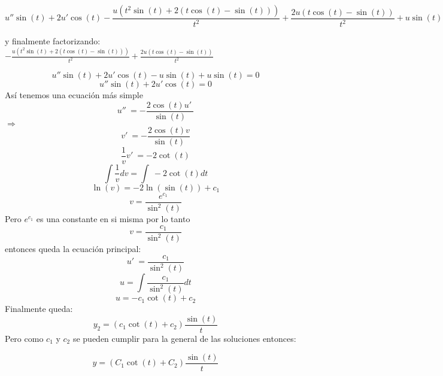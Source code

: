     $$u''\sin \left(t\right)+2u'\cos \left(t\right)-\frac{u\left(t^2\sin \left(t\right)+2\left(t\cos \left(t\right)-\sin \left(t\right)\right)\right)}{t^2}+\frac{2u\left(t\cos \left(t\right)-\sin \left(t\right)\right)}{t^2}+u\sin \left(t\right)$$
    
    y finalmente factorizando: $-\frac{u\left(t^2\sin \left(t\right)+2\left(t\cos \left(t\right)-\sin \left(t\right)\right)\right)}{t^2}+\frac{2u\left(t\cos \left(t\right)-\sin \left(t\right)\right)}{t^2}$
    
    $$u''\sin \left(t\right)+2u'\cos \left(t\right)-u\sin \left(t\right)+u\sin \left(t\right)=0$$
    $$u''\sin \left(t\right)+2u'\cos \left(t\right)=0$$
    Así tenemos una ecuación más simple
    $$u''\:=-\frac{2\cos \left(t\right)u'\:}{\sin \left(t\right)}$$
    $\Rightarrow$
    $$v'\:=-\frac{2\cos \left(t\right)v}{\sin \left(t\right)}$$
    $$\frac{1}{v}v'\:=-2\cot \left(t\right)$$
    $$\int \frac{1}{v}dv=\int \:-2\cot \left(t\right)dt$$
    $$\ln \left(v\right)=-2\ln \left(\sin \left(t\right)\right)+c_1$$
    $$v=\frac{e^{c_1}}{\sin ^2\left(t\right)}$$
    Pero $e^{c_1}$ es una constante en si misma por lo tanto
    $$v=\frac{c_1}{\sin ^2\left(t\right)}$$
    entonces queda la ecuación principal:
    $$u'\:=\frac{c_1}{\sin ^2\left(t\right)}$$
    $$u=\int \frac{c_1}{\sin ^2\left(t\right)}dt$$
    $$u=-c_1\cot \left(t\right)+c_2$$
    Finalmente queda:
    $$y_2=\left(c_1\cot \left(t\right)+c_2 \right)\frac{\sin(t)}{t}$$
    Pero como $c_1$ y $c_2$ se pueden cumplir para la general de las soluciones entonces:
    
    $$y=\left(C_1\cot \left(t\right)+C_2 \right)\frac{\sin(t)}{t}$$
    
